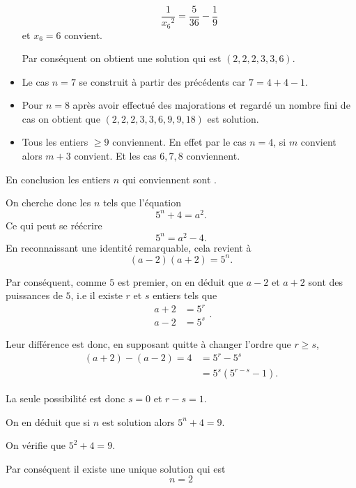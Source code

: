 \begin{sol}
\begin{itemize}
          \[\frac{1}{{x_6}^2} = \frac{5}{36} - \frac{1}{9}\]
          et $x_6 = 6$ convient.


          Par conséquent on obtient une solution qui est $(2,2,2,3,3,6)$.
    \item Le cas $n=7$ se construit à partir des précédents car $7 = 4 + 4 -1$.
    \item Pour $n=8$ après avoir effectué des majorations et regardé un nombre fini de cas on obtient que $(2,2,2,3,3,6,9,9,18)$ est solution.
    \item Tous les entiers $\geq 9$ conviennent. En effet par le cas $n=4$, si $m$ convient alors $m+3$ convient. Et les cas $6,7,8$ conviennent.
  \end{itemize}

  En conclusion les entiers $n$ qui conviennent sont .

\end{sol}
\begin{sol}
  On cherche donc les $n$ tels que l'équation
  \[5^n + 4 = a^2.\]
  Ce qui peut se réécrire
  \[5^n = a^2 - 4.\]
  En reconnaissant une identité remarquable, cela revient à
  \[(a-2)(a+2) = 5^n.\]

  Par conséquent, comme $5$ est premier, on en déduit que $a-2$ et $a+2$ sont des puissances de $5$, i.e il existe $r$ et $s$ entiers tels que
  \[\begin{aligned}
      a + 2 & = 5^r \\
      a - 2 & = 5^s
    \end{aligned}.\]

  Leur différence est donc, en supposant quitte à changer l'ordre que $r \geq s$,
  \[\begin{aligned}
      (a+2)-(a-2) = 4 & = 5^r-5^s          \\
                      & = 5^s (5^{r-s}-1).
    \end{aligned}\]

  La seule possibilité est donc $s=0$ et $r-s=1$.

  On en déduit que si $n$ est solution alors $5^n + 4 = 9$.

  On vérifie que $5^2 + 4 = 9$.

  Par conséquent il existe une unique solution qui est
  \[\boxed{n=2}\]


\end{sol}


